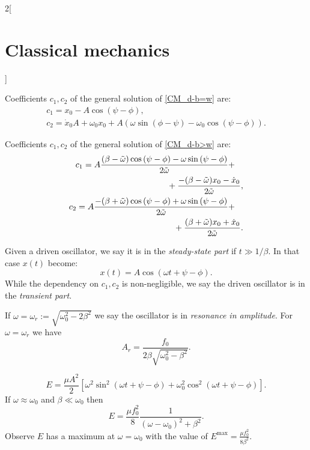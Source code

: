 \documentclass[../../../main.tex]{subfiles}
\begin{document}
\begin{multicols}{2}[\section{Classical mechanics}]
  \begin{prop}
    Coefficients $c_1,c_2$ of the general solution of \cref{CM_d-b=w} are:
    \begin{gather*}
      c_1=x_0-A\cos\left(\psi-\phi\right),\\
      c_2=\dot{x}_0A+\omega_0x_0+A\left(\omega\sin\left(\phi-\psi\right)-\omega_0\cos\left(\psi-\phi\right)\right).
    \end{gather*}
  \end{prop}
  \begin{prop}
    Coefficients $c_1,c_2$ of the general solution of \cref{CM_d-b>w} are:
    \begin{equation*}
      \begin{split}
        \begin{multlined}[t]
          c_1=A\frac{(\beta-\Tilde{\omega})\cos\left(\psi-\phi\right)-\omega\sin\left(\psi-\phi\right)}{2\Tilde{\omega}}+\\+\frac{-(\beta-\Tilde{\omega})x_0-\dot{x}_0}{2\Tilde{\omega}},
        \end{multlined}\\
        \begin{multlined}[t]
          c_2=A\frac{-(\beta+\Tilde{\omega})\cos\left(\psi-\phi\right)+\omega\sin\left(\psi-\phi\right)}{2\Tilde{\omega}}+\\+\frac{(\beta+\Tilde{\omega})x_0+\dot{x}_0}{2\Tilde{\omega}}.
        \end{multlined}
      \end{split}
    \end{equation*}
  \end{prop}
  \begin{definition}
    Given a driven oscillator, we say it is in the \textit{steady-state part} if $t\gg 1/\beta$. In that case $x(t)$ become: $$x(t)=A\cos(\omega t+\psi-\phi).$$ While the dependency on $c_1,c_2$ is non-negligible, we say the driven oscillator is in the \textit{transient part}.
  \end{definition}
  \begin{prop}
    If $\omega=\omega_r:=\sqrt{\omega_0^2-2\beta^2}$ we say the oscillator is in \textit{resonance in amplitude}. For $\omega=\omega_r$ we have $$A_r=\frac{f_0}{2\beta\sqrt{\omega_0^2-\beta^2}}.$$
  \end{prop}
  \begin{prop}
    $$E=\frac{\mu A^2}{2}\left[\omega^2\sin^2(\omega t+\psi-\phi)+\omega_0^2\cos^2(\omega t+\psi-\phi)\right].$$ If $\omega\approx\omega_0$ and $\beta\ll\omega_0$ then $$E=\frac{\mu f_0^2}{8}\frac{1}{(\omega-\omega_0)^2+\beta^2}.$$ Observe $E$ has a maximum at $\omega=\omega_0$ with the value of $E^\text{max}=\frac{\mu f_0^2}{8\beta^2}$.

\end{prop}
\end{multicols}
\end{document}
